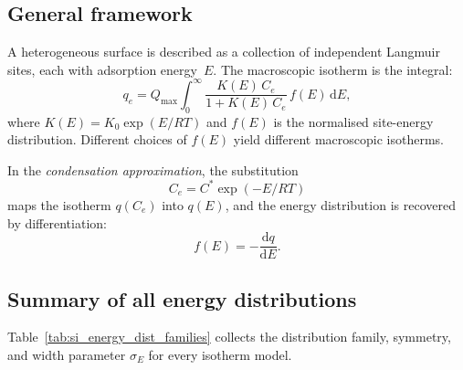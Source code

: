 \documentclass[journal=jacsat,manuscript=article]{achemso}
\begin{document}
\subsection{General framework}
\label{sec:si_energy_framework}

A heterogeneous surface is described as a collection of independent
Langmuir sites, each with adsorption energy~$E$.  The macroscopic
isotherm is the integral:
\begin{equation}
	q_e = Q_{\max} \int_{0}^{\infty}
	\frac{K(E)\, C_e}{1 + K(E)\, C_e}\, f(E)\, \mathrm{d}E,
	\label{eq:si_heterogeneous_integral}
\end{equation}
where $K(E) = K_0\exp(E/RT)$ and $f(E)$ is the normalised site-energy
distribution.  Different choices of $f(E)$ yield different
macroscopic isotherms.

In the \emph{condensation approximation}, the substitution
\begin{equation}
	C_e = C^{\ast}\exp(-E/RT)
	\label{eq:si_condensation}
\end{equation}
maps the isotherm $q(C_e)$ into $q(E)$, and the energy distribution
is recovered by differentiation:
\begin{equation}
	f(E) = -\frac{\mathrm{d}q}{\mathrm{d}E}.
	\label{eq:si_fE_derivative}
\end{equation}

\subsection{Summary of all energy distributions}
\label{sec:si_dist_summary}

Table~\ref{tab:si_energy_dist_families} collects the distribution
family, symmetry, and width parameter $\sigma_E$ for every isotherm
model.
\end{document}
